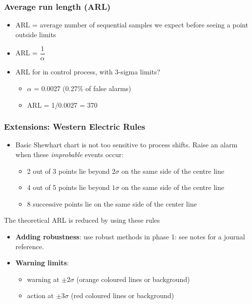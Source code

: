 \begin{frame}\frametitle{Average run length (ARL)}
	\begin{itemize}
		\item	ARL = average number of sequential samples we expect before seeing a point outside limits
		\item	ARL = $\dfrac{1}{\alpha}$
		\item	ARL for in control process, with 3-sigma limits?
		\begin{itemize}
			\item	$\alpha$ = 0.0027 (0.27\% of false alarms)
			\item	ARL = 1/0.0027 = 370
		\end{itemize}
	\end{itemize}
\end{frame}

\begin{frame}\frametitle{Extensions: Western Electric Rules}
	\begin{itemize}
		\item	Basic Shewhart chart is not too sensitive to process shifts. Raise an alarm when these \emph{improbable} events occur:
		\begin{itemize}
			\item	2 out of 3 points lie beyond $2\sigma$ on the same side of the centre line
			\item	4 out of 5 points lie beyond $1\sigma$ on the same side of the centre line
			\item	8 successive points lie on the same side of the center line
		\end{itemize}
	\end{itemize}

	The theoretical ARL is reduced by using these rules
	\begin{itemize}
		\item	\textbf{Adding robustness}: use robust methods in phase 1: see notes for a journal reference.
	\end{itemize}
	\begin{itemize}
		\item	\textbf{Warning limits}:
		\begin{itemize}
			\item	warning at $\pm 2 \sigma$ (orange coloured lines or background)
			\item	action at $\pm 3\sigma$ (red coloured lines or background)
		\end{itemize}
	\end{itemize}
\end{frame}

